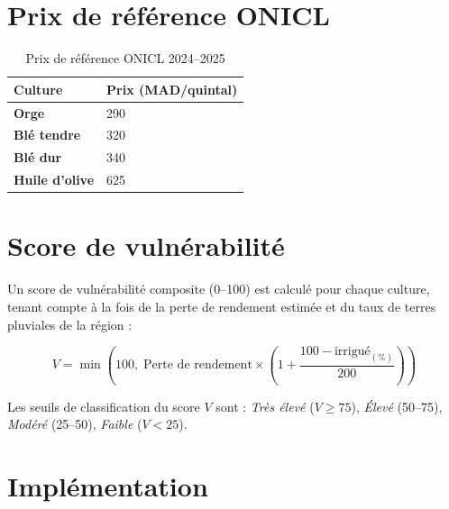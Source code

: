 \documentclass[12pt,a4paper]{report}
\begin{document}
\section{Prix de référence ONICL}

\begin{table}[H]
    \centering
    \begin{tabular}{>{\bfseries}p{4cm}p{5cm}}
        \toprule
        Culture & Prix (MAD/quintal) \\
        \midrule
        Orge & 290 \\
        Blé tendre & 320 \\
        Blé dur & 340 \\
        Huile d'olive & 625 \\
        \bottomrule
    \end{tabular}
    \caption{Prix de référence ONICL 2024--2025}
\end{table}

\section{Score de vulnérabilité}

Un score de vulnérabilité composite (0--100) est calculé pour chaque culture, tenant compte à la fois de la perte de rendement estimée et du taux de terres pluviales de la région :

\begin{equation}
    V = \min\!\left(100,\; \text{Perte de rendement} \times \left(1 + \frac{100 - \text{irrigué}_{(\%)}}{200}\right)\right)
\end{equation}

Les seuils de classification du score $V$ sont : \textit{Très élevé} ($V \geq 75$), \textit{Élevé} (50--75), \textit{Modéré} (25--50), \textit{Faible} ($V < 25$).

\section{Implémentation}
\end{document}
